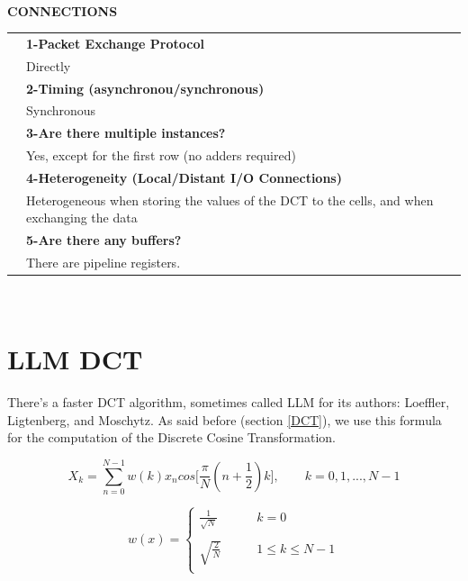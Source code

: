    \newpage{\large\textbf{ }}\vspace{10pt}\\
   {\large\textbf{CONNECTIONS}}\vspace{10pt}\\\begin{tabular}{ p{0.2cm} p{14.5cm}}
   	&\textbf{1-Packet Exchange Protocol}\\
   	&Directly\vspace{7pt}\\
   	&\textbf{2-Timing (asynchronou/synchronous)}\\
   	&Synchronous\vspace{7pt}\\
   	&\textbf{3-Are there multiple instances? }\\
   	&Yes, except for the first row (no adders required)\vspace{7pt}\\
   	&\textbf{4-Heterogeneity (Local/Distant I/O Connections)}\\
   	&Heterogeneous when storing the values of the DCT to the cells, and when exchanging the data\vspace{7pt}\\
   	&\textbf{5-Are there any buffers?}\\
   	&There are pipeline registers.
   \end{tabular}\vspace{14pt}\\
   \clearpage
   \section{LLM DCT}
   There's a faster DCT algorithm, sometimes called LLM for its authors: Loeffler, Ligtenberg, and Moschytz. \cite{dct1}
   As said before (section \ref{DCT}), we use this formula for the computation of the Discrete Cosine Transformation.
   \bigskip
   
     \begin{equation} \label{eq:dct_eq_1}	
     X_{k}= \sum_{n=0}^{N-1} w(k)x_{n}cos\bigg[\frac{\pi}{N} (n+\frac{1}{2})k\bigg], \qquad k=0,1,...,N-1
     \end{equation}
     
     
     \[
     w(x)=\left\{
     \begin{array}{ll}
     \frac{1}{\sqrt{N}} & \qquad k=0\\
     &\\
     \sqrt{\frac{2}{N}} & \qquad 1\leqslant k \leqslant N-1\\
     \end{array}
     \right.
     \]
     \bigskip
     
